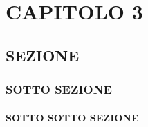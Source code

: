 \chapter{CAPITOLO 3} \label{Cap.3}
\vspace{2cm}

\begin{flushright}
    \textit{\lipsum[1][1-5]}
\end{flushright}

\vspace{0.5cm}



\lipsum[1-5]


\section{SEZIONE}
\lipsum[6]

\subsection{SOTTO SEZIONE}
\lipsum[7]

\subsubsection{SOTTO SOTTO SEZIONE}
\lipsum[8]

